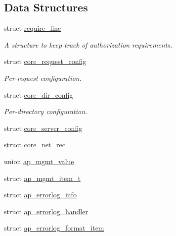 \subsection*{Data Structures}
\begin{DoxyCompactItemize}
\item 
struct \hyperlink{structrequire__line}{require\+\_\+line}
\begin{DoxyCompactList}\small\item\em A structure to keep track of authorization requirements. \end{DoxyCompactList}\item 
struct \hyperlink{structcore__request__config}{core\+\_\+request\+\_\+config}
\begin{DoxyCompactList}\small\item\em Per-\/request configuration. \end{DoxyCompactList}\item 
struct \hyperlink{structcore__dir__config}{core\+\_\+dir\+\_\+config}
\begin{DoxyCompactList}\small\item\em Per-\/directory configuration. \end{DoxyCompactList}\item 
struct \hyperlink{structcore__server__config}{core\+\_\+server\+\_\+config}
\item 
struct \hyperlink{structcore__net__rec}{core\+\_\+net\+\_\+rec}
\item 
union \hyperlink{unionap__mgmt__value}{ap\+\_\+mgmt\+\_\+value}
\item 
struct \hyperlink{structap__mgmt__item__t}{ap\+\_\+mgmt\+\_\+item\+\_\+t}
\item 
struct \hyperlink{structap__errorlog__info}{ap\+\_\+errorlog\+\_\+info}
\item 
struct \hyperlink{structap__errorlog__handler}{ap\+\_\+errorlog\+\_\+handler}
\item 
struct \hyperlink{structap__errorlog__format__item}{ap\+\_\+errorlog\+\_\+format\+\_\+item}
\end{DoxyCompactItemize}
